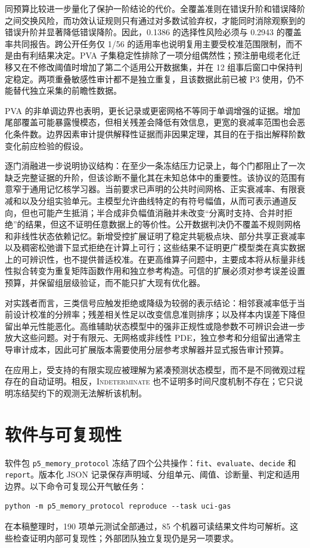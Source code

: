 \documentclass[UTF8,11pt]{ctexart}
\newcommand{\indet}{\textsc{Indeterminate}}
\begin{document}
同预算比较进一步量化了保护一阶结论的代价。全覆盖准则在错误升阶和错误降阶之间交换风险，而功效认证规则只有通过对多数试验弃权，才能同时消除观察到的错误升阶并显著降低错误降阶。因此，0.1386 的选择性风险必须与 0.2943 的覆盖率共同报告。跨公开任务仅 1/56 的适用率也说明复用主要受校准范围限制，而不是由有利结果决定。PVA 子集稳定性排除了一项分组偶然性；预注册电缆老化迁移又在不修改阈值时增加了第二个适用公开数据集，并在 12 组事后窗口中保持判定稳定。两项重叠敏感性审计都不是独立重复，且该数据此前已被 P3 使用，仍不能替代独立采集的前瞻性数据。

PVA 的非单调边界也表明，更长记录或更密网格不等同于单调增强的证据。增加尾部覆盖可能暴露慢模态，但相关残差会降低有效信息，更宽的衰减率范围也会恶化条件数。边界因素审计提供解释性证据而非因果定理，其目的在于指出解释阶数变化前应检验的假设。

逐门消融进一步说明协议结构：在至少一条冻结压力记录上，每个门都阻止了一次缺乏完整证据的升阶，但该诊断不量化其在未知总体中的重要性。该协议的范围有意窄于通用记忆核学习器。当前要求已声明的公共时间网格、正实衰减率、有限衰减和以及分组实验单元。主模型允许曲线特定的有符号幅值，从而可表示通道反向，但也可能产生抵消；半合成非负幅值消融并未改变“分离时支持、合并时拒绝”的结果，但这不证明任意数据上的等价性。公开数据判决仍不覆盖不规则网格和非线性状态依赖记忆。新增受控扩展证明了稳定共轭极点块、部分共享正衰减率以及稠密松弛谱下显式拒绝在计算上可行；这些结果不证明更广模型类在真实数据上的可辨识性，也不提供普适校准。在更高维算子问题中，主要成本将从标量非线性拟合转变为重复矩阵函数作用和独立参考构造。可信的扩展必须对参考误差设置预算，并保留组层级验证，而不能只扩大现有优化器。

对实践者而言，三类信号应触发拒绝或降级为较弱的表示结论：相邻衰减率低于当前设计校准的分辨率；残差相关性足以改变信息准则排序；以及样本内误差下降但留出单元性能恶化。高维辅助状态模型中的强非正规性或隐参数不可辨识会进一步放大这些问题。对于有限元、无网格或非线性 PDE，独立参考和分组留出通常主导审计成本，因此可扩展版本需要使用分层参考求解器并显式报告审计预算。

在应用上，受支持的有限实现应被理解为紧凑预测状态模型，而不是不同微观过程存在的自动证明。相反，\indet{} 也不证明多时间尺度机制不存在；它只说明冻结契约下的观测无法解析该机制。

\section{软件与可复现性}
软件包 \texttt{p5\_memory\_protocol} 冻结了四个公共操作：\texttt{fit}、\texttt{evaluate}、\texttt{decide} 和 \texttt{report}。版本化 JSON 记录保存声明域、分组单元、阈值、诊断量、判定和适用边界。以下命令可复现公开气敏任务：
\begin{verbatim}
python -m p5_memory_protocol reproduce --task uci-gas
\end{verbatim}
在本稿整理时，190 项单元测试全部通过，85 个机器可读结果文件均可解析。这些检查证明内部可复现性；外部团队独立复现仍是另一项要求。
\end{document}

